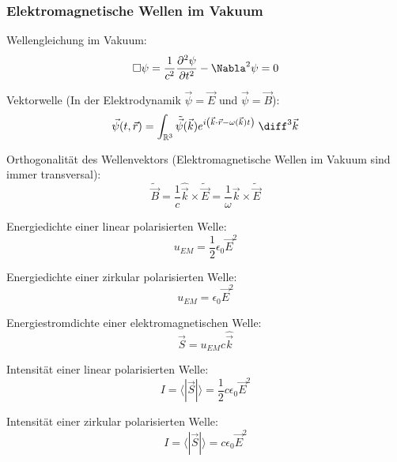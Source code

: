 \documentclass[11pt]{article}
\numberwithin{equation}{section}
\begin{document}
      \subsubsection{Elektromagnetische Wellen im Vakuum}
        Wellengleichung im Vakuum:
        \begin{equation}
          \Box\psi = \frac{1}{c^2} \frac{\partial^2 \psi}{\partial t^2} - \Nabla^2 \psi = 0
        \end{equation}

        Vektorwelle (In der Elektrodynamik $\vec{\psi}=\vec{E}$ und $ \vec{\psi}=\vec{B}$):
        \begin{equation}
          \vec{\psi}(t,\vec{r}) = \int_{\mathbb{R}^3} \tilde{\vec{\psi}} (\vec{k}) e^{i\left(\vec{k}\cdot\vec{r} - \omega(\vec{k})t \right)}\; \diff^3\vec{k}
        \end{equation}

        Orthogonalität des Wellenvektors (Elektromagnetische Wellen im Vakuum sind immer transversal):
        \begin{equation}
          \tilde{\vec{B}} = \frac{1}{c}\hat{\vec{k}}\times\tilde{\vec{E}} = \frac{1}{\omega}\vec{k}\times\tilde{\vec{E}}
        \end{equation}

        Energiedichte einer linear polarisierten Welle:
        \begin{equation}
          u_{EM} = \frac{1}{2}\epsilon_0\vec{E}^2
        \end{equation}

        Energiedichte einer zirkular polarisierten Welle:
        \begin{equation}
          u_{EM} = \epsilon_0\vec{E}^2
        \end{equation}

        Energiestromdichte einer elektromagnetischen Welle:
        \begin{equation}
          \vec{S} = u_{EM}c\hat{\vec{k}}
        \end{equation}

        Intensität einer linear polarisierten Welle:
        \begin{equation}
          I = \langle|\vec{S}|\rangle = \frac{1}{2}c\epsilon_0\vec{E}^2
        \end{equation}

        Intensität einer zirkular polarisierten Welle:
        \begin{equation}
          I = \langle|\vec{S}|\rangle = c\epsilon_0\vec{E}^2
        \end{equation}
\end{document}
